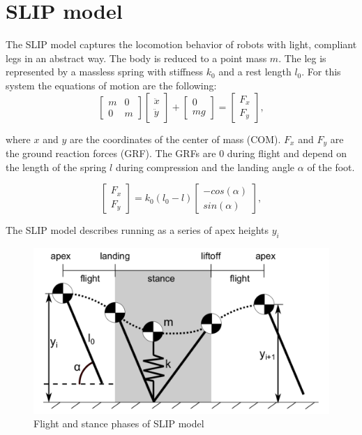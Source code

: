 \documentclass[10pt,conference]{IEEEtran}
\begin{document}
\section{SLIP model}
\label{sec:SLIP model}
The SLIP model captures the locomotion behavior of robots with light, compliant legs in an abstract way. The body is reduced to a point mass \( m \). The
leg is represented by a massless spring with stiffness \({k}_0 \) and a rest length \({l}_0 \). For this system the equations of motion are the following:
\begin{equation}
   \begin{bmatrix} m & 0 \\ 0 & m \end{bmatrix}
   \begin{bmatrix} \ddot{x} \\ \ddot{y} \end{bmatrix}
   +
   \begin{bmatrix} 0 \\ mg \end{bmatrix}
   =
   \begin{bmatrix} {F}_{x} \\ {F}_{y} \end{bmatrix},
   \label{eq:equation of motion}
\end{equation}

where \(x\) and \(y\) are the coordinates of the center of mass (COM). \({F}_x \) and \({F}_y \) are the ground reaction forces (GRF). The GRFs are 0 during flight and depend 
on the length of the spring \(l\) during compression and the landing angle \(\alpha\) of the foot.

\begin{equation}
   \begin{bmatrix} {F}_{x}  \\ {F}_{y}  \end{bmatrix}
   =
   {k}_{0} ({l}_{0} -l)
   \begin{bmatrix} -cos(\alpha) \\ sin(\alpha) \end{bmatrix},
\end{equation}

The SLIP model describes running as a series of apex heights \({y}_i \)

\begin{figure}[h]
   \centering
   \includegraphics[scale=0.2]{"assets/SMM2.pdf"}
   \caption{Flight and stance phases of SLIP model \cite{Wu2014}}
   \label{fig_SLIP_phase}
\end{figure}
\end{document}

